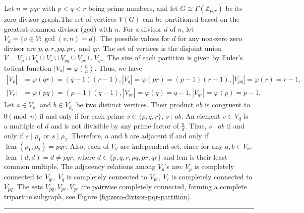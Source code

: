 \documentclass[12pt,twoside]{article}
\renewenvironment{proof}{{\noindent\bfseries Proof.}}{\qed}
\def\qed{\nolinebreak\hfill\rule{.2cm}{.2cm}\par\addvspace{.5cm}}
\begin{document}
\begin{proof}
	Let $n=pqr$ with $p<q<r$ being prime numbers, and let $ G\cong \varGamma(\mathbb{Z}_{pqr})$ be its zero divisor graph.The set of vertices $V(G)$ can be partitioned based on the greatest common divisor (gcd) with $n$. For a divisor $d$ of $n$, let $V_d = \{v \in V : \gcd(v, n) = d\}$. The possible values for $d$ for any non-zero zero divisor are $p, q, r, pq, pr, $ and $qr$. The set of vertices is the disjoint union $V = V_p \cup V_q \cup V_r \cup V_{pq} \cup V_{pr} \cup V_{qr}$. The size of each partition is given by Euler's totient function $|V_d| = \varphi(\tfrac n d)$. Thus, we have
\begin{align*}
	|V_p| &= \varphi(qr) = (q-1)(r-1), |V_q| = \varphi(pr) = (p-1)(r-1), |V_{pq}|= \varphi(r) = r-1,\\
	|V_r| &= \varphi(pq) = (p-1)(q-1),	  |V_{pr}| = \varphi(q) = q-1, |V_{qr}| = \varphi(p) = p-1.
\end{align*}
Let $a \in V_{\rho_1}$ and $b \in V_{\rho_2}$ be two distinct vertices. Their product $ab$ is congruent to $0 \pmod n$ if and only if for each prime $s \in \{p,q,r\}$, $s \mid ab$. An element $v \in V_d$ is a multiple of $d$ and is not divisible by any prime factor of $\tfrac n d$. Thus, $s \mid ab$ if and only if $s \mid \rho_1$ or $s \mid \rho_2$. Therefore, $a$ and $b$ are adjacent if and only if $\operatorname{lcm}(\rho_1, \rho_2) = pqr$. Also, each of $V_{d}$ are independent set, since for any $a,b \in V_d$, $\operatorname{lcm}(d,d) = d \neq pqr$, where $d\in \{p, q, r, pq, pr, qr\}$ and lcm is their least common multiple. The adjacency relations among $V_{d}$'s are: $V_p$ is completely connected to $V_{qr}$, $V_q$ is completely connected to $V_{pr}$, $V_r$ is completely connected to $V_{pq}$. The sets $V_{pq}, V_{pr}, V_{qr}$ are pairwise completely connected, forming a complete tripartite subgraph, see Figure \ref{fig:zero-divisor-pqr-partition}.  
\begin{figure}[H]
	\centering
\end{figure}
\end{proof}
\end{document}
